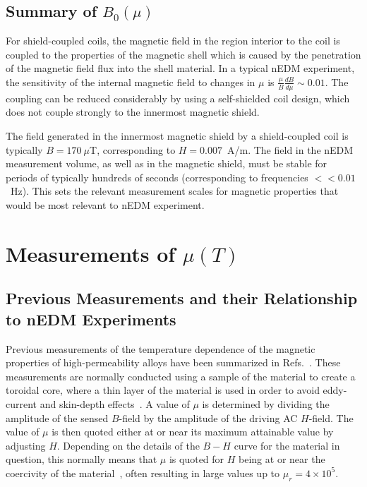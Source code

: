 \documentclass[review]{elsarticle}
\begin{document}
\subsection{Summary of $B_0(\mu)$}

For shield-coupled coils, the magnetic field in the region interior to
the coil is coupled to the properties of the magnetic shell which is
caused by the penetration of the magnetic field flux into the shell
material. In a typical nEDM experiment, the sensitivity of the
internal magnetic field to changes in $\mu$ is
$\frac{\mu}{B}\frac{dB}{d\mu}\sim 0.01$.  The coupling can be reduced
considerably by using a self-shielded coil design, which does not
couple strongly to the innermost magnetic shield.

The field generated in the innermost magnetic shield by a
shield-coupled coil is typically $B=170~\mu$T, corresponding to
$H=0.007$~A/m.  The field in the nEDM measurement volume, as well as
in the magnetic shield, must be stable for periods of typically
hundreds of seconds (corresponding to frequencies $<<0.01$~Hz).  This
sets the relevant measurement scales for magnetic properties that
would be most relevant to nEDM experiment.


\section{Measurements of $\mu(T)$}

\subsection{Previous Measurements and their Relationship to nEDM Experiments\label{previousmeasurement}}

Previous measurements of the temperature dependence of the magnetic
properties of high-permeability alloys have been summarized in
Refs.~\cite{bib:pfeifer,bib:bozorth,bib:couderchon}.  These
measurements are normally conducted using a sample of the material to
create a toroidal core, where a thin layer of the material is used in
order to avoid eddy-current and skin-depth
effects~\cite{bib:pfeifer,bib:kruppvdm}.  A value of $\mu$ is
determined by dividing the amplitude of the sensed $B$-field by the
amplitude of the driving AC $H$-field.  The value of $\mu$ is then
quoted either at or near its maximum attainable value by adjusting
$H$.  Depending on the details of the $B-H$ curve for the material in
question, this normally means that $\mu$ is quoted for $H$ being at or
near the coercivity of the
material~\cite{bib:couderchon,bib:kruppvdm}, often resulting in large
values up to $\mu_r=4\times 10^5$.
\end{document}
